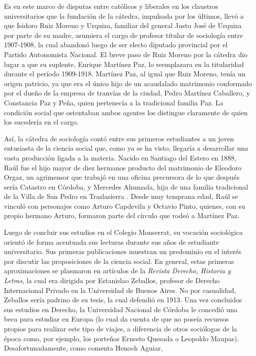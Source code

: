 Es en este marco de disputas entre católicos y liberales en los claustros universitarios que la fundación de la cátedra, impulsada por los últimos, llevó a que Isidoro Ruiz Moreno y Urquiza, familiar del general Justo José de Urquiza por parte de su madre, asumiera el cargo de profesor titular de sociología entre 1907-1908, la cual abandonó luego de ser electo diputado provincial por el Partido Autonomista Nacional. El breve paso de Ruiz Moreno por la cátedra dio lugar a que su suplente, Enrique Martínez Paz, lo reemplazara en la titularidad durante el período 1909-1918. Martínez Paz, al igual que Ruiz Moreno, tenía un origen patricio, ya que era el único hijo de un acaudalado matrimonio conformado por el dueño de la empresa de tranvías de la ciudad, Pedro Martínez Caballero, y Constancia Paz y Peña, quien pertenecía a la tradicional familia Paz. La condición social que ostentaban ambos agentes los distingue claramente de quien los sucedería en el cargo.

Así, la cátedra de sociología contó entre sus primeros estudiantes a un joven entusiasta de la ciencia social que, como ya se ha visto, llegaría a desarrollar una vasta producción ligada a la materia. Nacido en Santiago del Estero en 1888, Raúl fue el hijo mayor de diez hermanos producto del matrimonio de Eleodoro Orgaz, un agrimensor que trabajó en una oficina precursora de lo que después sería Catastro en Córdoba, y Mercedes Ahumada, hija de una familia tradicional de la Villa de San Pedro en Traslasierra \parencite{1687-IGHINA1996}. Desde muy temprana edad, Raúl se vinculó con personajes como Arturo Capdevila y Octavio Pinto, quienes, con su propio hermano Arturo, formaron parte del círculo que rodeó a Martínez Paz.

Luego de concluir sus estudios en el Colegio Monserrat, su vocación sociológica orientó de forma acentuada sus lecturas durante sus años de estudiante universitario. Sus primeras publicaciones muestran un predominio en el interés por discutir las proposiciones de la ciencia social. En general, estas primeras aproximaciones se plasmaron en artículos de la \emph{Revista Derecho, Historia y Letras}, la cual era dirigida por Estanislao Zeballos, profesor de Derecho Internacional Privado en la Universidad de Buenos Aires. No por casualidad, Zeballos sería padrino de su tesis, la cual defendió en 1913. Una vez concluidos sus estudios en Derecho, la Universidad Nacional de Córdoba le concedió una beca para estudiar en Europa (lo cual da cuenta de que no poseía recursos propios para realizar este tipo de viajes, a diferencia de otros sociólogos de la época como, por ejemplo, los porteños Ernesto Quesada o Leopoldo Maupas). Desafortunadamente, como comenta Henoch Aguiar,

